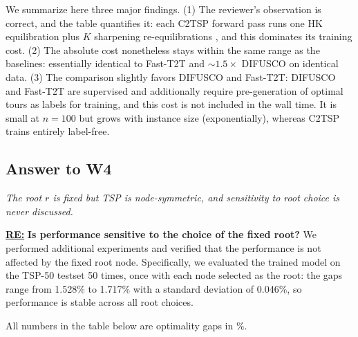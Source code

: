
We summarize here three major findings. (1) The reviewer's observation is correct, and the table quantifies it: each C2TSP forward pass runs one HK equilibration plus $K$ sharpening re-equilibrations , and this dominates its training cost. (2) The absolute cost nonetheless stays within the same range as the baselines: essentially identical to Fast-T2T and $\sim 1.5\times$ DIFUSCO on identical data. (3) The comparison slightly favors DIFUSCO and Fast-T2T: DIFUSCO and Fast-T2T are supervised and additionally require pre-generation of optimal tours as labels for training, and this cost is not included in the wall time. It is small at $n=100$ but grows with instance size (exponentially), whereas C2TSP trains entirely label-free.

\subsection{Answer to W4}

\textit{The root $r$ is fixed but TSP is node-symmetric, and sensitivity to root choice is never discussed.}

\textbf{\underline{RE:}}
\textbf{Is performance sensitive to the choice of the fixed root?} We performed additional experiments and verified that the performance is not affected by the fixed root node. Specifically, we evaluated the trained model on the TSP-50 testset 50 times, once with each node selected as the root: the gaps range from 1.528\% to 1.717\% with a standard deviation of 0.046\%, so performance is stable across all root choices.

All numbers in the table below are optimality gaps in $\%$.

